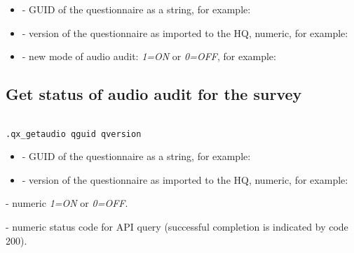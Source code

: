 \paramsheader
\begin{itemize}
    \item {} - GUID of the questionnaire as a string, for example:

    \item {} - version of the questionnaire as imported
          to the HQ, numeric, for example:

    \item {} - new mode of audio audit: \textit{1=ON} or
          \textit{0=OFF}, for example:

\end{itemize}

\subsection{Get status of audio audit for the survey}
\begin{lstlisting}[style=CommandLineStyle, showlines=true]

.qx_getaudio qguid qversion

\end{lstlisting}

\paramsheader
\begin{itemize}

    \item {} - GUID of the questionnaire as a string, for example:

    \item {} - version of the questionnaire as imported
          to the HQ, numeric, for example:

\end{itemize}

\savedres
\begin{compactitem}

    \item {} - numeric \textit{1=ON} or
    \textit{0=OFF}.

    \item {} - numeric status code for API query
    (successful completion is indicated by code 200).

\end{compactitem}
